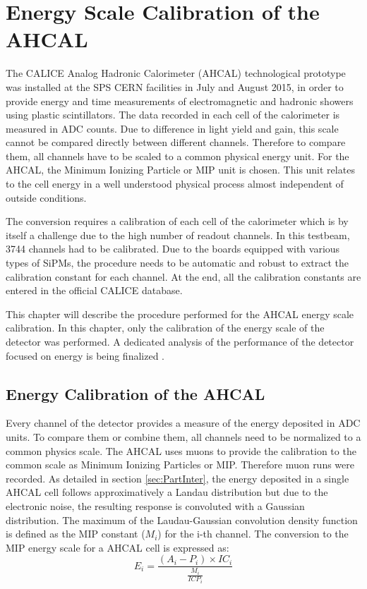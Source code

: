 \chapter{Energy Scale Calibration of the AHCAL}
\label{chap:ECalibAHCAL}

The CALICE Analog Hadronic Calorimeter (AHCAL) technological prototype was installed at the SPS CERN facilities in July and August 2015, in order to provide energy and time measurements of electromagnetic and hadronic showers using plastic scintillators. The data recorded in each cell of the calorimeter is measured in ADC counts. Due to difference in light yield and gain, this scale cannot be compared directly between different channels. Therefore to compare them, all channels have to be scaled to a common physical energy unit. For the AHCAL, the Minimum Ionizing Particle or MIP unit is chosen. This unit relates to the cell energy in a well understood physical process almost independent of outside conditions.

The conversion requires a calibration of each cell of the calorimeter which is by itself a challenge due to the high number of readout channels. In this testbeam, 3744 channels had to be calibrated. Due to the boards equipped with various types of SiPMs, the procedure needs to be automatic and robust to extract the calibration constant for each channel. At the end, all the calibration constants are entered in the official CALICE database.

This chapter will describe the procedure performed for the AHCAL energy scale calibration. In this chapter, only the calibration of the energy scale of the detector was performed. A dedicated analysis of the performance of the detector focused on energy is being finalized \cite{AmbraEnergy, AmbraTokyo}.

\section{Energy Calibration of the AHCAL}

Every channel of the detector provides a measure of the energy deposited in ADC units. To compare them or combine them, all channels need to be normalized to a common physics scale. The AHCAL uses muons to provide the calibration to the common scale as Minimum Ionizing Particles or MIP. Therefore muon runs were recorded. As detailed in section \ref{sec:PartInter}, the energy deposited in a single AHCAL cell follows approximatively a Landau distribution but due to the electronic noise, the resulting response is convoluted with a Gaussian distribution. The maximum of the Laudau-Gaussian convolution density function is defined as the MIP constant ($M_{i}$) for the i-th channel. The conversion to the MIP energy scale for a AHCAL cell is expressed as:
\begin{equation}
	E_i = \frac{(A_i - P_i) \times IC_i }{\frac{M_{i}}{ICP_i}}
\end{equation}

